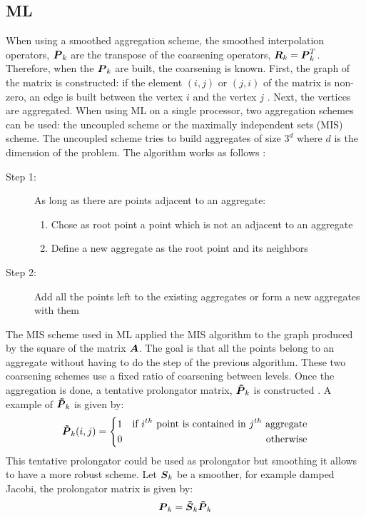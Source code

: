 \subsection{ML}
When using a smoothed aggregation scheme, the smoothed interpolation operators,
$\boldsymbol{P}_k$ are the transpose of the coarsening operators,
$\boldsymbol{R}_k=\boldsymbol{P}_k^T$. Therefore, when the $\boldsymbol{P}_k$ are built, the
coarsening is known. First, the graph of the matrix is constructed: if the element
$(i,j)$ or $(j,i)$ of the matrix is non-zero, an edge is built between the
vertex $i$ and the vertex $j$ \cite{ml_guide}. Next, the vertices are
aggregated. When using ML on a single processor, two aggregation schemes can
be used: the uncoupled scheme or the maximally independent sets (MIS) scheme. 
The uncoupled scheme tries to build aggregates of size $3^d$ where $d$ is the
dimension of the problem. The algorithm works as follows \cite{mis}:
\begin{description}
  \item[Step 1:] As long as there are points adjacent to an aggregate:
    \begin{enumerate}
      \item Chose as root point a point which is not an adjacent to an
        aggregate
      \item Define a new aggregate as the root point and its neighbors 
    \end{enumerate}
  \item[Step 2:] Add all the points left to the existing aggregates or form a
    new aggregates with them
\end{description}
The MIS scheme used in ML applied the MIS algorithm \cite{graph_coloring} to
the graph produced by the square of the matrix $\boldsymbol{A}$. The goal is that all
the points belong to an aggregate without having to do the step of the
previous algorithm. These two coarsening schemes use a fixed ratio of 
coarsening between levels. Once the aggregation is done, a tentative
prolongator matrix, $\boldsymbol{\tilde{P}}_k$ is constructed \cite{mis}. A example of
$\boldsymbol{\tilde{P}}_k$ is given by:
\begin{equation}
  \boldsymbol{\tilde{P}}_k(i,j) = \left\{
  \begin{aligned}
    &1 &\textrm{if }i^{th}\textrm{ point is contained in }j^{th}\textrm{
    aggregate}\\
    & 0 &\textrm{otherwise}
  \end{aligned}
  \right.
\end{equation}
This tentative prolongator could be used as prolongator but smoothing it
allows to have a more robust scheme. Let $\boldsymbol{S}_k$ be a smoother, for example
damped Jacobi, the prolongator matrix is given by:
\begin{equation}
  \boldsymbol{P}_k = \boldsymbol{\tilde{S}}_k \boldsymbol{\tilde{P}}_k
\end{equation}

